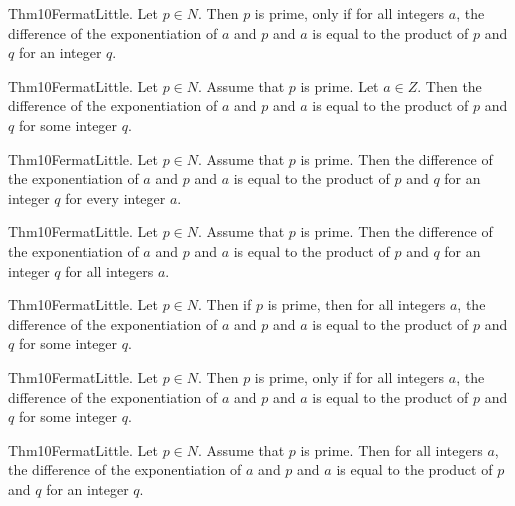 \documentclass{article}
\begin{document}
Thm10FermatLittle. Let $p \in N$. Then $p$ is prime, only if for all integers $a$, the difference of the exponentiation of $a$ and $p$ and $a$ is equal to the product of $p$ and $q$ for an integer $q$.

Thm10FermatLittle. Let $p \in N$. Assume that $p$ is prime. Let $a \in Z$. Then the difference of the exponentiation of $a$ and $p$ and $a$ is equal to the product of $p$ and $q$ for some integer $q$.

Thm10FermatLittle. Let $p \in N$. Assume that $p$ is prime. Then the difference of the exponentiation of $a$ and $p$ and $a$ is equal to the product of $p$ and $q$ for an integer $q$ for every integer $a$.

Thm10FermatLittle. Let $p \in N$. Assume that $p$ is prime. Then the difference of the exponentiation of $a$ and $p$ and $a$ is equal to the product of $p$ and $q$ for an integer $q$ for all integers $a$.

Thm10FermatLittle. Let $p \in N$. Then if $p$ is prime, then for all integers $a$, the difference of the exponentiation of $a$ and $p$ and $a$ is equal to the product of $p$ and $q$ for some integer $q$.

Thm10FermatLittle. Let $p \in N$. Then $p$ is prime, only if for all integers $a$, the difference of the exponentiation of $a$ and $p$ and $a$ is equal to the product of $p$ and $q$ for some integer $q$.

Thm10FermatLittle. Let $p \in N$. Assume that $p$ is prime. Then for all integers $a$, the difference of the exponentiation of $a$ and $p$ and $a$ is equal to the product of $p$ and $q$ for an integer $q$.
\end{document}
